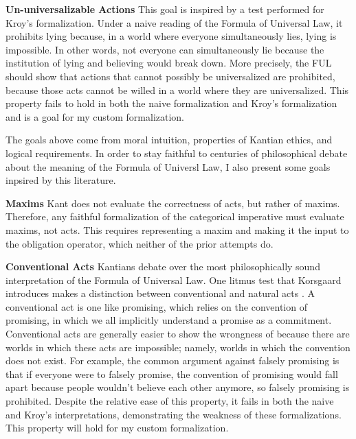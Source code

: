 \begin{isabellebody}
\begin{isamarkuptext}
\medskip 

\textbf{Un-universalizable Actions} This goal is inspired by a test performed for Kroy's formalization. Under 
a naive reading of the Formula of Universal Law, it prohibits lying because, in a world 
where everyone simultaneously lies, lying is impossible. In other words, not everyone can simultaneously
lie because the institution of lying and believing would break down. More precisely, the FUL should 
show that actions that cannot possibly be universalized are prohibited, because those acts cannot be willed in 
a world where they are universalized. This property fails to hold in both the naive formalization 
and Kroy's formalization and is a goal for my custom formalization.%
\end{isamarkuptext}\isamarkuptrue%
%
\isadelimdocument
%
\endisadelimdocument
%
\isatagdocument
%
\isamarkuptrue%
%
\endisatagdocument
{\isafolddocument}%
%
\isadelimdocument
%
\endisadelimdocument
%
\begin{isamarkuptext}%
The goals above come from moral intuition, properties of Kantian ethics, and logical requirements. 
In order to stay faithful to centuries of philosophical debate about the meaning of the Formula of 
Universl Law, I also present some goals inpsired by this literature.

\textbf{Maxims} Kant does not evaluate the correctness of acts, but rather of maxims. Therefore, any 
faithful formalization of the categorical imperative must evaluate maxims, not acts. This requires 
representing a maxim and making it the input to the obligation operator, which neither of the prior attempts do.

\medskip%
\end{isamarkuptext}\isamarkuptrue%
%
\begin{isamarkuptext}%
\textbf{Conventional Acts}
Kantians debate over the most philosophically sound interpretation of the Formula of Universal Law.
One litmus test that Korsgaard introduces makes a distinction between conventional and natural acts \citep{KorsgaardFUL}. 
A conventional act is one like promising, which relies on the convention of promising, in which we all
implicitly understand a promise as a commitment. Conventional acts are generally easier to show the 
wrongness of because there are worlds in which these acts are impossible; namely, worlds in which the 
convention does not exist. For example, the common argument against falsely promising is that if 
everyone were to falsely promise, the convention of promising would fall apart because people wouldn't believe
each other anymore, so falsely promising is prohibited. Despite the relative ease of this property,
it fails in both the naive and Kroy's interpretations, demonstrating the weakness of these 
formalizations. This property will hold for my custom formalization.


\end{isamarkuptext}
\end{isabellebody}
